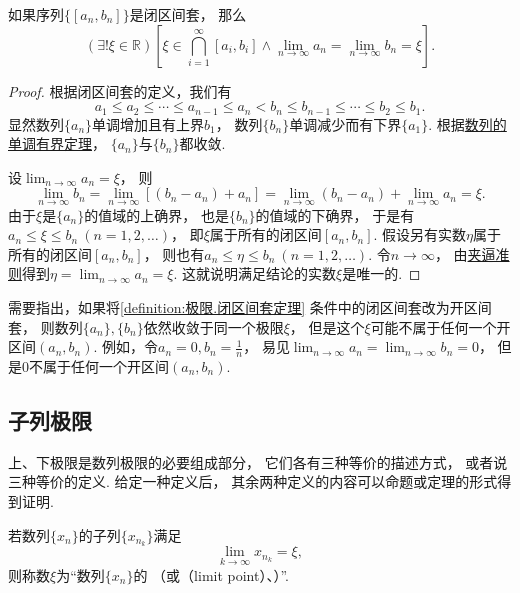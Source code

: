 \begin{theorem}[闭区间套定理]\label{definition:极限.闭区间套定理}
如果序列\(\{[a_n,b_n]\}\)是闭区间套，
那么\begin{equation*}
	(\exists!\xi\in\mathbb{R})
	\left[
		\xi \in \bigcap_{i=1}^\infty [a_i,b_i]
		\land
		\lim_{n\to\infty} a_n = \lim_{n\to\infty} b_n = \xi
	\right].
\end{equation*}
\begin{proof}
根据闭区间套的定义，我们有\begin{equation*}
	a_1 \leq a_2 \leq \dotsb \leq a_{n-1} \leq a_n
	< b_n \leq b_{n-1} \leq \dotsb \leq b_2 \leq b_1.
\end{equation*}
显然数列\(\{a_n\}\)单调增加且有上界\(b_1\)，
数列\(\{b_n\}\)单调减少而有下界\(\{a_1\}\).
根据\hyperref[theorem:极限.数列的单调有界定理]{数列的单调有界定理}，
\(\{a_n\}\)与\(\{b_n\}\)都收敛.

设\(\lim_{n\to\infty} a_n = \xi\)，
则\begin{equation*}
	\lim_{n\to\infty} b_n
	= \lim_{n\to\infty} [(b_n - a_n) + a_n]
	= \lim_{n\to\infty} (b_n - a_n) + \lim_{n\to\infty} a_n
	= \xi.
\end{equation*}
由于\(\xi\)是\(\{a_n\}\)的值域的上确界，
也是\(\{b_n\}\)的值域的下确界，
于是有\(a_n \leq \xi \leq b_n\ (n=1,2,\dotsc)\)，
即\(\xi\)属于所有的闭区间\([a_n,b_n]\).
假设另有实数\(\eta\)属于所有的闭区间\([a_n,b_n]\)，
则也有\(a_n \leq \eta \leq b_n\ (n=1,2,\dotsc)\).
令\(n\to\infty\)，
由\hyperref[theorem:数列极限.夹逼准则]{夹逼准则}得到\(\eta=\lim_{n\to\infty} a_n=\xi\).
这就说明满足结论的实数\(\xi\)是唯一的.
\end{proof}
\end{theorem}

需要指出，如果将\cref{definition:极限.闭区间套定理} 条件中的闭区间套改为开区间套，
则数列\(\{a_n\},\{b_n\}\)依然收敛于同一个极限\(\xi\)，
但是这个\(\xi\)可能不属于任何一个开区间\((a_n,b_n)\).
例如，令\(a_n = 0, b_n = \frac1n\)，
易见\(\lim_{n\to\infty} a_n = \lim_{n\to\infty} b_n = 0\)，
但是\(0\)不属于任何一个开区间\((a_n,b_n)\).

\subsection{子列极限}
上、下极限是数列极限的必要组成部分，
它们各有三种等价的描述方式，
或者说三种等价的定义.
给定一种定义后，
其余两种定义的内容可以命题或定理的形式得到证明.

\begin{definition}
若数列\(\{x_n\}\)的子列\(\{x_{n_k}\}\)满足\begin{equation*}
	\lim_{k\to\infty} x_{n_k} = \xi,
\end{equation*}
则称数\(\xi\)为“数列\(\{x_n\}\)的%
（或（limit point）、）”.
\end{definition}

